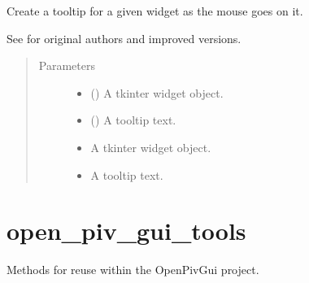 \documentclass[letterpaper,10pt,english]{sphinxmanual}
\begin{document}
\begin{fulllineitems}
\label{\detokenize{createtooltip:openpivgui.CreateToolTip.CreateToolTip}}
Create a tooltip for a given widget as the mouse goes on it.

See  for original authors and
improved versions.
\begin{quote}\begin{description}
\item[{Parameters}] \leavevmode\begin{itemize}
\item {} 
 () \textendash{} A tkinter widget object.

\item {} 
 () \textendash{} A tooltip text.

\item {} 
 \textendash{} A tkinter widget object.

\item {} 
 \textendash{} A tooltip text.

\end{itemize}

\end{description}\end{quote}

\end{fulllineitems}



\section{open\_piv\_gui\_tools}
\label{\detokenize{open_piv_gui_tools:module-openpivgui.open_piv_gui_tools}}\label{\detokenize{open_piv_gui_tools:open-piv-gui-tools}}\label{\detokenize{open_piv_gui_tools::doc}}
Methods for reuse within the OpenPivGui project.
\end{document}
